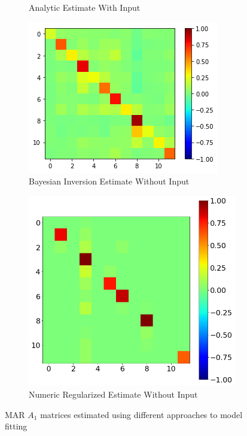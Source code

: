 \documentclass[a4paper,10pt]{article}
\begin{document}
\begin{figure}
\begin{subfigure}[b]{0.4\textwidth}
        \caption{Analytic Estimate With Input}
        \label{fig:marN_analytic_withinput_A1}
    \end{subfigure}
    \begin{subfigure}[b]{0.4\textwidth}
        \includegraphics[width=\textwidth]{img/marN_penny_noinput_A1_avg.png}
        \caption{Bayesian Inversion Estimate Without Input}
        \label{fig:marN_penny_noinput_A1_avg}
    \end{subfigure}\hspace{0.05\textwidth}
    \begin{subfigure}[b]{0.4\textwidth}
        \includegraphics[width=\textwidth]{img/mar1_numeric_constr_A1.png}
        \caption{Numeric Regularized Estimate Without Input}
        \label{fig:mar1_numeric_constr_A1}
    \end{subfigure}
    \caption{MAR $A_1$ matrices estimated using different approaches to model fitting}\label{fig:marN_A1_estimate_by_method}
\end{figure}
\end{document}
